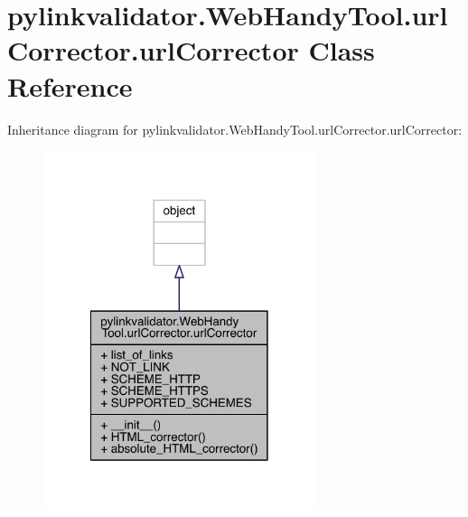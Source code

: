\hypertarget{classpylinkvalidator_1_1_web_handy_tool_1_1url_corrector_1_1url_corrector}{}\section{pylinkvalidator.\+Web\+Handy\+Tool.\+url\+Corrector.\+url\+Corrector Class Reference}
\label{classpylinkvalidator_1_1_web_handy_tool_1_1url_corrector_1_1url_corrector}


Inheritance diagram for pylinkvalidator.\+Web\+Handy\+Tool.\+url\+Corrector.\+url\+Corrector\+:
\nopagebreak
\begin{figure}[H]
\begin{center}
\leavevmode
\includegraphics[width=226pt]{classpylinkvalidator_1_1_web_handy_tool_1_1url_corrector_1_1url_corrector__inherit__graph}
\end{center}
\end{figure}


